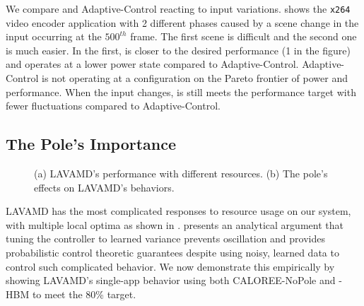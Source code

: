 %   
We compare \SYSTEM{} and Adaptive-Control reacting to input
variations.   shows the \texttt{x264}
video encoder application with 2 different phases caused by a scene
change in the input occurring at the $500^{th}$ frame. The first scene
is difficult and the second one is much easier.  In the first,
\SYSTEM{} is closer to the desired performance (1 in the figure) and
operates at a lower power state compared to Adaptive-Control.
Adaptive-Control is not operating at a configuration on the Pareto
frontier of power and performance.  When the input changes, \SYSTEM{}
is still meets the performance target with fewer fluctuations compared
to Adaptive-Control.


\subsection{The Pole's Importance}
\begin{figure}
\centering
  \subfloat[]
  {
    
    \label{fig:lavamd-pole}
  }
  \caption{(a) LAVAMD's performance with different resources. (b) The
    pole's effects on LAVAMD's behaviors.}
  \label{fig:lavamd-is-hard}
\end{figure}


LAVAMD has the most complicated responses to resource usage on our
system, with multiple local optima as shown in .
 presents an analytical argument that tuning the
controller to learned variance prevents oscillation and provides
probabilistic control theoretic guarantees despite using noisy,
learned data to control such complicated behavior.  We now demonstrate
this empirically by showing LAVAMD's single-app behavior using both
CALOREE-NoPole and \SYSTEM{}-HBM to meet the 80\% target.


